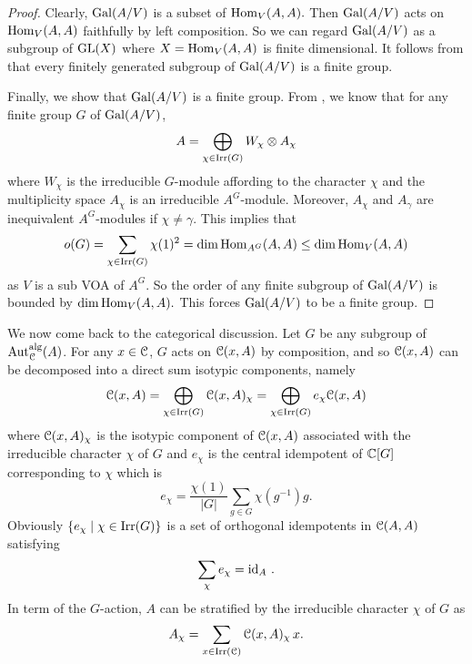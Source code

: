 \documentclass{amsart}
\begin{document}
\begin{proof}
Clearly, ${\rm Gal}(A/V)$ is a subset of $\operatorname{Hom}_V(A,A).$ Then ${\rm Gal}(A/V)$ acts on $ \operatorname{Hom}_V(A,A)$ faithfully  by left composition.  So we can regard ${\rm Gal}(A/V)$ as a subgroup of ${\rm GL}(X)$ where $X=\operatorname{Hom}_V(A,A)$ is finite dimensional. It follows from \cite{S1911} that every finitely generated  subgroup of ${\rm Gal}(A/V)$ is a finite group. 


Finally, we show that ${\rm Gal}(A/V)$ is a finite group. From \cite{DLMcomp1996}, we know that for any finite group $G$ of ${\rm Gal}(A/V)$, 
$$A=\bigoplus_{\chi\in\operatorname{Irr}(G)}W_{\chi}\otimes A_\chi$$
where $W_\chi$ is the irreducible $G$-module affording to the character $\chi$ and the multiplicity space $A_{\chi}$ is an irreducible $A^G$-module. Moreover, $A_{\chi}$ and $A_{\gamma}$ are inequivalent $A^G$-modules if $\chi\ne \gamma.$ This implies  that 
$$o(G)=\sum_{\chi\in\operatorname{Irr}(G)}\chi(1)^2=\dim\operatorname{Hom}_{A^G}(A,A)\leq \dim\operatorname{Hom}_{V}(A,A)$$
as $V$ is a sub VOA of $A^G.$ So the order of any finite subgroup of  ${\rm Gal}(A/V)$ is bounded by $\dim\operatorname{Hom}_{V}(A,A).$ This forces  ${\rm Gal}(A/V)$ to be a finite group.
\end{proof}

We now come back to the categorical discussion.
Let $G$ be any subgroup of ${\operatorname{Aut}_{\EuScript{C}}^{\operatorname{alg}}}(A)$. For any $x \in {\EuScript{C}}$,  $G$ acts on ${\EuScript{C}}(x,A)$ by composition, and so ${\EuScript{C}}(x,A)$ can be decomposed into a direct sum isotypic components, namely
$$
{\EuScript{C}}(x,A) =\bigoplus_{\chi\in\operatorname{Irr}(G)} {\EuScript{C}}(x,A)_\chi = \bigoplus_{\chi\in\operatorname{Irr}(G)} e_\chi{\EuScript{C}}(x,A)
$$
where ${\EuScript{C}}(x,A)_\chi$ is the isotypic component of ${\EuScript{C}}(x,A)$ associated with the irreducible character $\chi$ of $G$ and $e_\chi$ is the central idempotent of $\mathbb{C}[G]$ corresponding to  $\chi$ which is
\[
e_\chi=\frac{\chi(1)}{|G|}
\sum_{g\in G}\chi(g^{-1})g.
\]
 Obviously $\{e_{\chi}\mid  \chi \in \operatorname{Irr}(G)\}$ is a set of orthogonal idempotents in ${\EuScript{C}}(A,A)$ satisfying 
$$ 
\sum_{\chi} e_{\chi} = \operatorname{id}_A\,.
$$
In term of the $G$-action,  $A$ can be stratified by the irreducible character $\chi$ of $G$ as 
$$
A_\chi = \sum_{x  \in \operatorname{Irr}({\EuScript{C}})} {\EuScript{C}}(x,A)_\chi\, x.
$$
\end{document}
